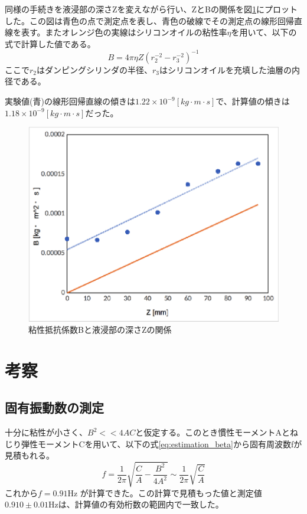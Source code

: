\documentclass[11pt,a4]{jarticle}
\begin{document}
同様の手続きを液浸部の深さZを変えながら行い、ZとBの関係を図\ref{fig:B}にプロットした。この図は青色の点で測定点を表し、青色の破線でその測定点の線形回帰直線を表す。またオレンジ色の実線はシリコンオイルの粘性率$\eta$を用いて、以下の式で計算した値である。
\begin{equation}
B =  4\pi \eta Z (r_2^{-2} -r_3^{-2} )^{-1}
\label{eq:B}
\end{equation}
ここで$r_2$はダンピングシリンダの半径、$r_3$はシリコンオイルを充填した油層の内径である。

実験値(青)の線形回帰直線の傾きは$1.22\times10^{-9} [kg\cdot m \cdot s]$で、計算値の傾きは$1.18\times10^{-9} [kg\cdot m \cdot s]$だった。

\begin{figure}[htbp]
   \begin{center}
    \includegraphics[width=0.6\hsize]{./B.eps}
    \caption{粘性抵抗係数Bと液浸部の深さZの関係}
     \label{fig:B}
   \end{center}
\end{figure}


\section{考察}
\subsection{固有振動数の測定}
十分に粘性が小さく、$B^2<<4AC$と仮定する。このとき慣性モーメントAとねじり弾性モーメントCを用いて、以下の式\ref{eq:estimation_beta}から固有周波数fが見積もれる。
\begin{equation}
f =  \frac{1}{2\pi}\sqrt{\frac{C}{A}-\frac{B^2}{4A^2}} \sim \frac{1}{2\pi}\sqrt{\frac{C}{A}}
\label{eq:estimation_beta}
\end{equation}
これから$f = 0.91 $Hz が計算できた。この計算で見積もった値と測定値$0.910 \pm 0.01$Hzは、計算値の有効桁数の範囲内で一致した。
\end{document}
